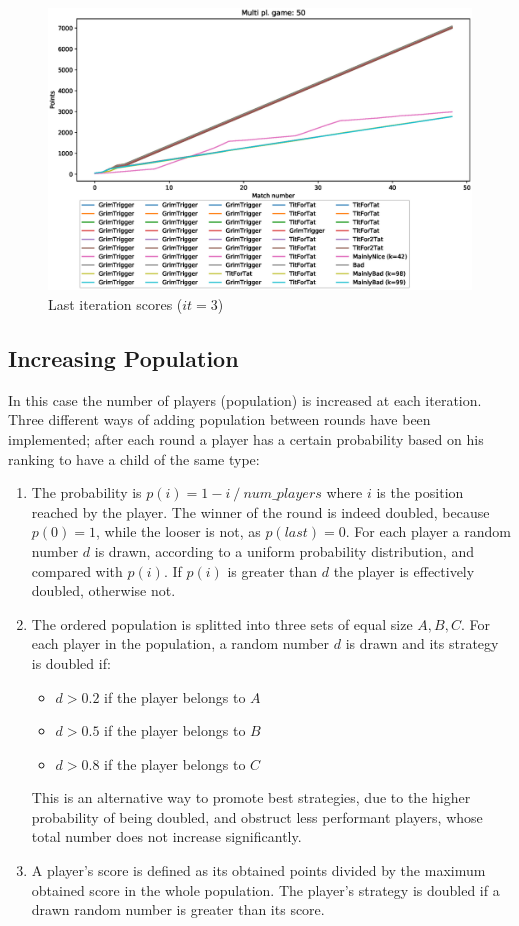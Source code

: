 \documentclass[journal,10pt,twoside]{IEEEtran}
\begin{document}
\begin{figure}[!ht]
    \centering
    \includegraphics[width=1\columnwidth]{../img/ripdmp-const/ripdmp-scores-const-pop-50-r3}
    \caption{Last iteration scores ($it=3$)}
    \label{fig:constLI}
\end{figure}

\subsection{Increasing Population}
In this case the number of players (population) is increased at each iteration. Three different ways of adding population between rounds have been implemented; after each round a player has a certain probability based on his ranking to have a child of the same type:
\begin{enumerate}
    \item The probability is $p(i)=1- i\ /\ num\_players$ where $i$ is the position reached by the player. The winner of the round is indeed doubled, because $p(0)=1$, while the looser is not, as $p(last)=0$.
    For each player a random number $d$ is drawn, according to a uniform probability distribution, and compared with $p(i)$. If $p(i)$ is greater than $d$ the player is effectively doubled, otherwise not.
    \item The ordered population is splitted into three sets of equal size $A,B,C$. For each player in the population, a random number $d$ is drawn and its strategy is doubled if:
    \begin{itemize}
        \item $d>0.2$ if the player belongs to $A$
        \item $d>0.5$ if the player belongs to $B$
        \item $d>0.8$ if the player belongs to $C$
    \end{itemize}
    This is an alternative way to promote best strategies, due to the higher probability of being doubled, and obstruct less performant players, whose total number does not increase significantly.
    \item A player's score is defined as its obtained points divided by the maximum obtained score in the whole population. The player's strategy is doubled if a drawn random number is greater than its score.
\end{enumerate}
\end{document}
